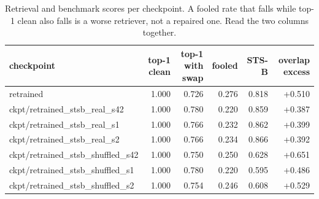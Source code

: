 \begin{table}[t]
\centering
\small
\caption{Retrieval and benchmark scores per checkpoint. A fooled rate that falls while top-1 clean also falls is a worse retriever, not a repaired one. Read the two columns together.}
\begin{tabular}{lrrrrr}
\toprule
checkpoint & top-1 clean & top-1 with swap & fooled & STS-B & overlap excess \\
\midrule
retrained & 1.000 & 0.726 & 0.276 & 0.818 & +0.510 \\
ckpt/retrained\_stsb\_real\_s42 & 1.000 & 0.780 & 0.220 & 0.859 & +0.387 \\
ckpt/retrained\_stsb\_real\_s1 & 1.000 & 0.766 & 0.232 & 0.862 & +0.399 \\
ckpt/retrained\_stsb\_real\_s2 & 1.000 & 0.766 & 0.234 & 0.866 & +0.392 \\
ckpt/retrained\_stsb\_shuffled\_s42 & 1.000 & 0.750 & 0.250 & 0.628 & +0.651 \\
ckpt/retrained\_stsb\_shuffled\_s1 & 1.000 & 0.780 & 0.220 & 0.595 & +0.486 \\
ckpt/retrained\_stsb\_shuffled\_s2 & 1.000 & 0.754 & 0.246 & 0.608 & +0.529 \\
\bottomrule
\end{tabular}
\end{table}
